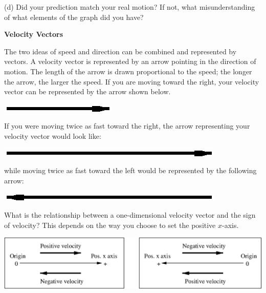 (d) Did your prediction match your real motion? If not, what misunderstanding
of what elements of the graph did you have?
\vspace{20mm}

\textbf{Velocity Vectors} 

The two ideas of speed and direction can be combined and represented by vectors.
A velocity vector is represented by an arrow pointing in the direction of motion.
The length of the arrow is drawn proportional to the speed; the longer the arrow,
the larger the speed. If you are moving toward the right, your velocity vector
can be represented by the arrow shown below.

\vspace{0.3cm}
{\par\centering \includegraphics{velocity/velocity_fig3.eps} \par}
\vspace{0.3cm}

If you were moving twice as fast toward the right, the arrow representing your
velocity vector would look like:

\vspace{0.3cm}
{\par\centering \includegraphics{velocity/velocity_fig4.eps} \par}
\vspace{0.3cm}

while moving twice as fast toward the left would be represented by the following
arrow:

\vspace{0.3cm}
{\par\centering \includegraphics{velocity/velocity_fig5.eps} \par}
\vspace{0.3cm}

What is the relationship between a one-dimensional velocity vector and the sign
of velocity? This depends on the way you choose to set the positive $x$-axis.

\vspace{0.3cm}
{\par\centering \includegraphics{velocity/velocity_fig6.eps} \par}
\vspace{0.3cm}

